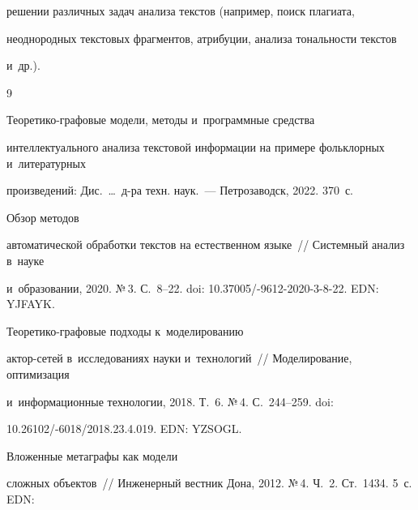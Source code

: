 решении различных задач анализа текстов (например, поиск плагиата, 


неоднородных текстовых фрагментов, атрибуции, анализа тональности текстов 


и~др.).


  


{\small\frenchspacing


{%




\begin{thebibliography}{9}







 Теоретико-графовые модели, методы и~программные средства 


интеллектуального анализа текс\-то\-вой информации на примере фольклорных и~литературных 


произведений: Дис.\ \ldots\  д-ра техн. наук.~--- Петрозаводск, 2022. 370~с.




 Обзор методов 


автоматической обработки текс\-тов на естественном языке~/\!\!/ Системный анализ в~науке 


и~образовании, 2020. №\,3. С.~8--22. doi: 10.37005\!/-9612-2020-3-8-22. EDN: YJFAYK.







 Тео\-ре\-ти\-ко-гра\-фо\-вые подходы к~моделированию  


актор-се\-тей в~исследованиях науки и~технологий~/\!\!/ Моделирование, оптимизация 


и~информационные технологии, 2018. Т.~6. №\,4. С.~244--259. doi:  


10.26102\!/-6018/2018.23.4.019. EDN: YZSOGL.      







 Вложенные метаграфы как модели 


сложных объектов~/\!\!/ Инженерный вестник Дона, 2012. №\,4. Ч.~2. Ст.~1434. 5~с. EDN: 



\end{thebibliography}}}
